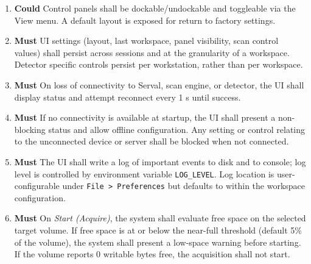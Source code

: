 \documentclass[10pt]{article}
\newcommand{\PriorityTag}[2]{%
    \colorbox{#2!25}{\footnotesize\textsf{\textbf{#1}}}\hspace{0.6em}}
\newcommand{\must}{\leavevmode\PriorityTag{Must}{green}}
\newcommand{\could}{\leavevmode\PriorityTag{Could}{cyan}}
\newcounter{reqgrp}[section] %
\newcounter{reqno}
\newcommand{\reqprefix}{GEN}
\newenvironment{requirements}[1]{%
    \renewcommand{\reqprefix}{#1}%
    \refstepcounter{reqgrp}%
    \setcounter{reqno}{0}%
    \begin{enumerate}[leftmargin=*]
    }{\end{enumerate}}
\begin{document}
\begin{requirements}{UI}
        \item \could {}
        {Control panels shall be dockable/undockable and toggleable via the View menu. A default layout is exposed for return to factory settings. }

        \item \must {}
        {UI settings (layout, last workspace, panel visibility, scan control values) shall persist across sessions and at the granularity of a workspace. Detector specific controls persist per workstation, rather than per workspace.}

        \item \must {}
        {On loss of connectivity to Serval, scan engine, or detector, the UI shall display status and attempt reconnect every 1 s until success.}

        \item \must {}
        {If no connectivity is available at startup, the UI shall present a non-blocking status and allow offline configuration. Any setting or control relating to the unconnected device or server shall be blocked when not connected.}

        \item \must {}
        {The UI shall write a log of important events to disk and to console; log level is controlled by environment variable \texttt{LOG\_LEVEL}. Log location is user-configurable under \texttt{File > Preferences} but defaults to within the workspace configuration.}

        \item \must {}
        {On \emph{Start (Acquire)}, the system shall evaluate free space on the selected target volume. If free space is at or below the near-full threshold (default 5\% of the volume), the system shall present a low-space warning before starting. If the volume reports 0 writable bytes free, the acquisition shall not start.}


\end{requirements}
\end{document}
